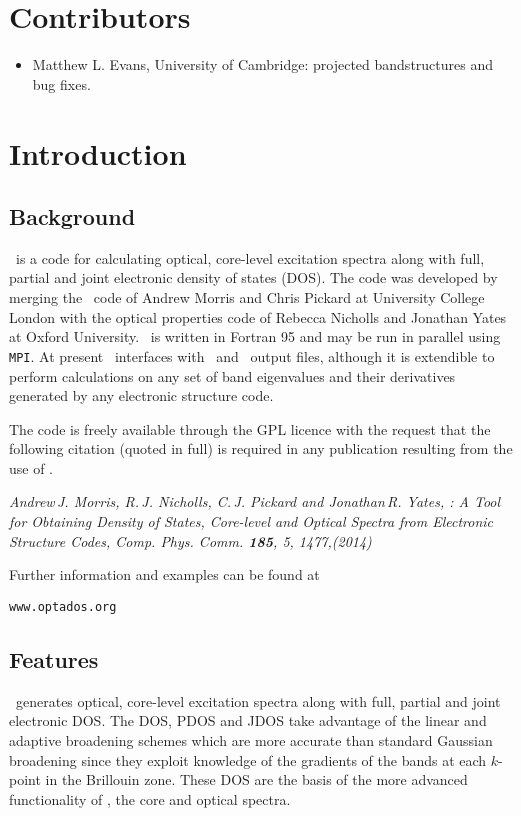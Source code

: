 \documentclass[a4paper,11pt,twoside]{book}
\begin{document}
\chapter*{Contributors}
 \thispagestyle{empty}

\begin{itemize}
\item Matthew L. Evans, University of Cambridge: projected bandstructures and bug fixes.
\end{itemize}

\chapter{Introduction}\label{chap:introduction}
\section{Background}
\optados\ is a code for calculating optical, core-level excitation spectra along with full, partial and joint electronic density of states (DOS).  The code was developed by merging the \lindos\ code of Andrew Morris and Chris Pickard at University College London with the optical properties code of Rebecca Nicholls and Jonathan Yates at Oxford University.  \optados\ is written in Fortran 95 and may be run in parallel using {\tt MPI}.  At present \optados\ interfaces with \castep\ and \onetep\ output files, although it is extendible to perform calculations on any set of band eigenvalues and their derivatives generated by any electronic structure code.

The code is freely available through the GPL licence with the request that the following citation (quoted in full) is required in any publication resulting from the use of \optados.

\emph{Andrew\,J. Morris, R.\,J. Nicholls, C.\,J. Pickard and Jonathan\,R. Yates, \optados: A Tool for Obtaining Density of States, Core-level and Optical Spectra from Electronic Structure Codes,  Comp. Phys. Comm. {\bf 185}, 5, 1477,(2014)}

\begin{center}
Further information and examples can be found at

\verb#www.optados.org#
\end{center}


\section{Features}
\optados\ generates optical, core-level excitation spectra along with full, partial and joint electronic DOS. The DOS, PDOS and JDOS take advantage of the linear and adaptive broadening schemes which are more accurate than standard Gaussian broadening since they exploit knowledge of the gradients of the bands at each $k$-point in the Brillouin zone.  These DOS are the basis of the more advanced functionality of \optados, the core and optical spectra.
\end{document}

